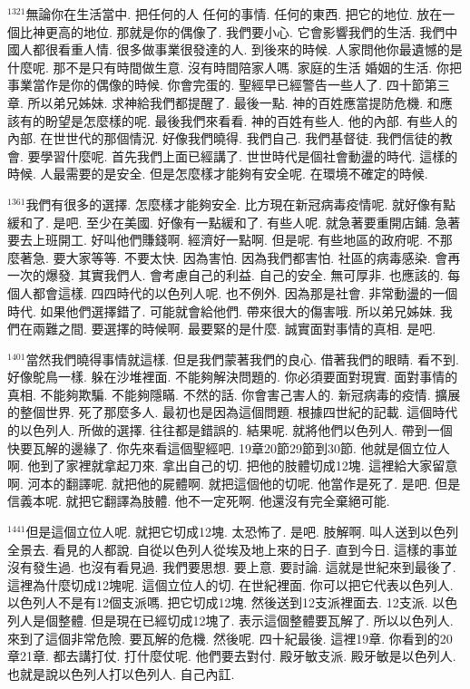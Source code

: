 \documentclass{book}
\begin{document}
$^{1321}$無論你在生活當中.
把任何的人 任何的事情.
任何的東西.
把它的地位.
放在一個比神更高的地位.
那就是你的偶像了.
我們要小心.
它會影響我們的生活.
我們中國人都很看重人情.
很多做事業很發達的人.
到後來的時候.
人家問他你最遺憾的是什麼呢.
那不是只有時間做生意.
沒有時間陪家人嗎.
家庭的生活 婚姻的生活.
你把事業當作是你的偶像的時候.
你會完蛋的.
聖經早已經警告一些人了.
四十節第三章.
所以弟兄姊妹.
求神給我們都提醒了.
最後一點.
神的百姓應當提防危機.
和應該有的盼望是怎麼樣的呢.
最後我們來看看.
神的百姓有些人.
他的內部.
有些人的內部.
在世世代的那個情況.
好像我們曉得.
我們自己.
我們基督徒.
我們信徒的教會.
要學習什麼呢.
首先我們上面已經講了.
世世時代是個社會動盪的時代.
這樣的時候.
人最需要的是安全.
但是怎麼樣才能夠有安全呢.
在環境不確定的時候.

$^{1361}$我們有很多的選擇.
怎麼樣才能夠安全.
比方現在新冠病毒疫情呢.
就好像有點緩和了.
是吧.
至少在美國.
好像有一點緩和了.
有些人呢.
就急著要重開店鋪.
急著要去上班開工.
好叫他們賺錢啊.
經濟好一點啊.
但是呢.
有些地區的政府呢.
不那麼著急.
要大家等等.
不要太快.
因為害怕.
因為我們都害怕.
社區的病毒感染.
會再一次的爆發.
其實我們人.
會考慮自己的利益.
自己的安全.
無可厚非.
也應該的.
每個人都會這樣.
四四時代的以色列人呢.
也不例外.
因為那是社會.
非常動盪的一個時代.
如果他們選擇錯了.
可能就會給他們.
帶來很大的傷害哦.
所以弟兄姊妹.
我們在兩難之間.
要選擇的時候啊.
最要緊的是什麼.
誠實面對事情的真相.
是吧.

$^{1401}$當然我們曉得事情就這樣.
但是我們蒙著我們的良心.
借著我們的眼睛.
看不到.
好像鴕鳥一樣.
躲在沙堆裡面.
不能夠解決問題的.
你必須要面對現實.
面對事情的真相.
不能夠欺騙.
不能夠隱瞞.
不然的話.
你會害己害人的.
新冠病毒的疫情.
擴展的整個世界.
死了那麼多人.
最初也是因為這個問題.
根據四世紀的記載.
這個時代的以色列人.
所做的選擇.
往往都是錯誤的.
結果呢.
就將他們以色列人.
帶到一個快要瓦解的邊緣了.
你先來看這個聖經吧.
19章20節29節到30節.
他就是個立位人啊.
他到了家裡就拿起刀來.
拿出自己的切.
把他的肢體切成12塊.
這裡給大家留意啊.
河本的翻譯呢.
就把他的屍體啊.
就把這個他的切呢.
他當作是死了.
是吧.
但是信義本呢.
就把它翻譯為肢體.
他不一定死啊.
他還沒有完全棄絕可能.

$^{1441}$但是這個立位人呢.
就把它切成12塊.
太恐怖了.
是吧.
肢解啊.
叫人送到以色列全景去.
看見的人都說.
自從以色列人從埃及地上來的日子.
直到今日.
這樣的事並沒有發生過.
也沒有看見過.
我們要思想.
要上意.
要討論.
這就是世紀來到最後了.
這裡為什麼切成12塊呢.
這個立位人的切.
在世紀裡面.
你可以把它代表以色列人.
以色列人不是有12個支派嗎.
把它切成12塊.
然後送到12支派裡面去.
12支派.
以色列人是個整體.
但是現在已經切成12塊了.
表示這個整體要瓦解了.
所以以色列人.
來到了這個非常危險.
要瓦解的危機.
然後呢.
四十紀最後.
這裡19章.
你看到的20章21章.
都去講打仗.
打什麼仗呢.
他們要去對付.
殿牙敏支派.
殿牙敏是以色列人.
也就是說以色列人打以色列人.
自己內訌.
\end{document}

